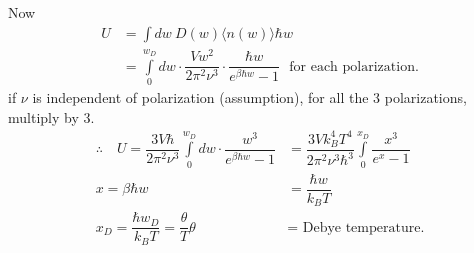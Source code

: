 Now
\begin{align*}
U &= \int dw \ D(w)\langle n(w)\rangle \hbar w\\
&= \int\limits^{w_{D}}_{0}dw\cdot \dfrac{Vw^{2}}{2\pi^{2}\nu^{3}}\cdot \dfrac{\hbar w}{e^{\beta\hbar w}-1}\text{~ for each polarization.}
\end{align*}
if $\nu$ is independent of polarization (assumption), for all the 3 polarizations, multiply by 3.
\begin{align*}
\therefore\quad U=\dfrac{3V\hbar}{2\pi^{2}\nu^{3}}\int\limits^{w_{D}}_{0}dw\cdot \dfrac{w^{3}}{e^{\beta \hbar w}-1} &= \dfrac{3Vk^{4}_{B}T^{4}}{2\pi^{2}\nu^{3}\hbar^{3}}\int\limits_{0}^{x_{D}}\dfrac{x^{3}}{e^{x}-1}\\
x = \beta\hbar w &= \dfrac{\hbar w}{k_{B}T}\\
x_{D}=\dfrac{\hbar w_{D}}{k_{B}T}=\dfrac{\theta}{T} \theta &= \text{ Debye temperature.}
\end{align*}
